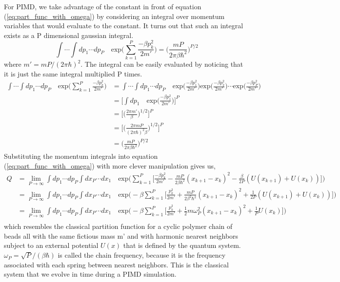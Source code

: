 \documentclass{article}
\newcommand{\be}{\begin{equation}}
\newcommand{\ee}{\end{equation}}
\begin{document}
For PIMD, we take advantage of the constant in front of equation (\ref{eq:part_func_with_omega}) by considering an integral over momentum variables that would evaluate to the constant.
It turns out that such an integral exists as a P dimensional gaussian integral.
\be
  \int \cdots \int dp_1 \cdots dp_P \quad \text{exp}\Big( \sum_{k=1}^P \frac{-\beta p^2_k}{2m'} \Big) = \Big( \frac{mP}{2 \pi \beta \hbar^2} \Big)^{P/2}
\ee
where $m' = mP/(2 \pi \hbar)^2$.
The integral can be easily evaluated by noticing that it is just the same integral multiplied P times.
\be
  \begin{split}
    \int \cdots \int dp_1 \cdots dp_P \quad \text{exp}\Big( \sum_{k=1}^P \frac{-\beta p^2_k}{2m'} \Big) &= \int \cdots \int dp_1 \cdots dp_P \quad \text{exp}\Big(\frac{-\beta p^2_1}{2m'} \Big) \text{exp}\Big( \frac{-\beta p^2_2}{2m'}\Big) \cdots \text{exp}\Big( \frac{-\beta p^2_P}{2m'} \Big) \\
    &= \Big[ \int dp_1 \quad \text{exp} \Big( \frac{-\beta p^2_1}{2m'} \Big)\Big]^P \\
    &= \Big[ \Big( \frac{2 \pi m'}{\beta} \Big)^{1/2} \Big]^P \\
    &= \Big[ \Big( \frac{2 \pi m P}{(2 \pi \hbar)^2 \beta } \Big)^{1/2} \Big]^P \\
    &= \Big( \frac{mP}{2 \pi \beta \hbar^2} \Big)^{P/2}
  \end{split}
\ee
Substituting the momentum integrals into equation (\ref{eq:part_func_with_omega}) with more clever manipulation gives us,
\be \label{eq:pimd_partition}
  \begin{split}
    Q &= \lim_{P \to\infty} \int dp_1 \cdots dp_P \int dx_P \cdots dx_1 \quad \text{exp}\Big( \sum_{k=1}^P \Big[ \frac{-\beta p^2_k}{2m'} - \frac{mP}{2 \beta \hbar^2}(x_{k+1} - x_k)^2 - \frac{\beta}{2P}(U(x_{k+1}) + U(x_k)) \Big] \Big) \\
    &= \lim_{P \to\infty} \int dp_1 \cdots dp_P \int dx_P \cdots dx_1 \quad \text{exp}\Big( - \beta \sum_{k=1}^P \Big[ \frac{p^2_k}{2m'} + \frac{mP}{2 \beta^2 \hbar^2}(x_{k+1} - x_k)^2 + \frac{1}{2P}(U(x_{k+1}) + U(x_k)) \Big] \Big) \\
    &= \lim_{P \to\infty} \int dp_1 \cdots dp_P \int dx_P \cdots dx_1 \quad \text{exp}\Big( - \beta \sum_{k=1}^P \Big[ \frac{p^2_k}{2m'} + \frac{1}{2} m \omega^2_P (x_{k+1} - x_k)^2 + \frac{1}{P} U(x_k) \Big] \Big) \\
  \end{split}
\ee
which resembles the classical partition function for a cyclic polymer chain of beads all with the same fictious mass m' and with harmonic nearest neighbors subject to an external potential $U(x)$ that is defined by the quantum system.
$\omega_P = \sqrt{P}/(\beta \hbar)$ is called the chain frequency, because it is the frequency associated with each spring between nearest neighbors.
This is the classical system that we evolve in time during a PIMD simulation.
\end{document}
